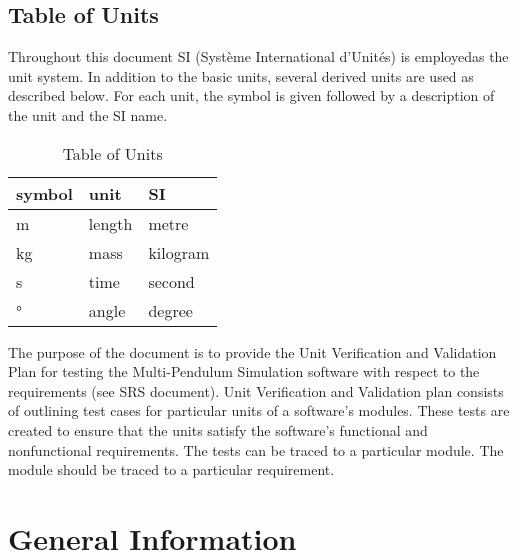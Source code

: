 \documentclass[12pt, titlepage]{article}
\newcommand{\progname}{Multi-Pendulum Simulation }
\begin{document}
\subsection{Table of Units}

Throughout this document SI (Syst\`{e}me International d'Unit\'{e}s) is
employedas the unit system. In addition to the basic units, several derived
units are
used as described below.  For each unit, the symbol is given followed by a
description of the unit and the SI name.\\

\renewcommand{\arraystretch}{1.2}
\begin{table}[h!]
	\centering
\begin{center}
  \noindent \begin{tabular}{l l l} 
    \toprule		
    \textbf{symbol} & \textbf{unit} & \textbf{SI}\\
    \midrule 
    \si{\metre} & length & metre\\
    \si{\kilogram} & mass & kilogram\\
    \si{\second} & time & second\\
    \si{\degree} & angle & degree\\
    \bottomrule
  \end{tabular}
\end{center}
	\caption{Table of Units}
	\label{Table:R_trace}
\end{table}

\newpage

\tableofcontents

\listoftables


\newpage


The purpose of the document is to provide the Unit Verification and Validation Plan for testing the \progname{}software with 
respect to the requirements (see SRS document). Unit Verification and 
Validation plan consists of outlining test cases for particular units of a 
software's modules. These tests are created to ensure that the units satisfy 
the software's functional and nonfunctional requirements. The tests can be 
traced to a particular module. The module should be traced to a particular 
requirement. 

\section{General Information}
\end{document}
